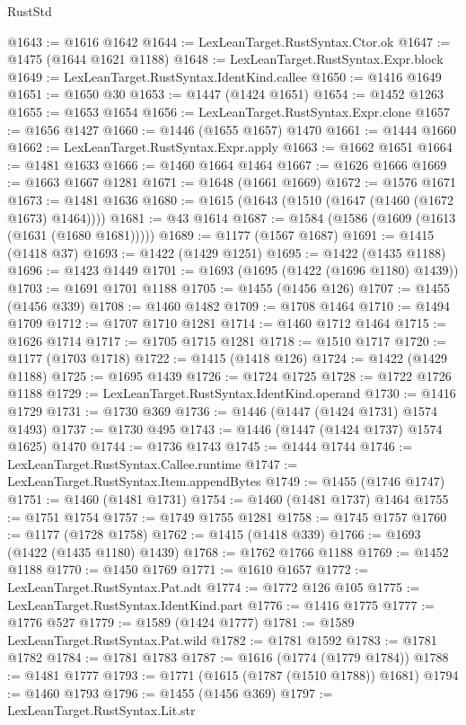 \begin{lexlean}{RustStd}
\begin{coremodule}
@1643 := @1616 @1642
@1644 := LexLeanTarget.RustSyntax.Ctor.ok
@1647 := @1475 (@1644 @1621 @1188)
@1648 := LexLeanTarget.RustSyntax.Expr.block
@1649 := LexLeanTarget.RustSyntax.IdentKind.callee
@1650 := @1416 @1649
@1651 := @1650 @30
@1653 := @1447 (@1424 @1651)
@1654 := @1452 @1263
@1655 := @1653 @1654
@1656 := LexLeanTarget.RustSyntax.Expr.clone
@1657 := @1656 @1427
@1660 := @1446 (@1655 @1657) @1470
@1661 := @1444 @1660
@1662 := LexLeanTarget.RustSyntax.Expr.apply
@1663 := @1662 @1651
@1664 := @1481 @1633
@1666 := @1460 @1664 @1464
@1667 := @1626 @1666
@1669 := @1663 @1667 @1281
@1671 := @1648 (@1661 @1669)
@1672 := @1576 @1671
@1673 := @1481 @1636
@1680 := @1615 (@1643 (@1510 (@1647 (@1460 (@1672 @1673) @1464))))
@1681 := @43 @1614
@1687 := @1584 (@1586 (@1609 (@1613 (@1631 (@1680 @1681)))))
@1689 := @1177 (@1567 @1687)
@1691 := @1415 (@1418 @37)
@1693 := @1422 (@1429 @1251)
@1695 := @1422 (@1435 @1188)
@1696 := @1423 @1449
@1701 := @1693 (@1695 (@1422 (@1696 @1180) @1439))
@1703 := @1691 @1701 @1188
@1705 := @1455 (@1456 @126)
@1707 := @1455 (@1456 @339)
@1708 := @1460 @1482
@1709 := @1708 @1464
@1710 := @1494 @1709
@1712 := @1707 @1710 @1281
@1714 := @1460 @1712 @1464
@1715 := @1626 @1714
@1717 := @1705 @1715 @1281
@1718 := @1510 @1717
@1720 := @1177 (@1703 @1718)
@1722 := @1415 (@1418 @126)
@1724 := @1422 (@1429 @1188)
@1725 := @1695 @1439
@1726 := @1724 @1725
@1728 := @1722 @1726 @1188
@1729 := LexLeanTarget.RustSyntax.IdentKind.operand
@1730 := @1416 @1729
@1731 := @1730 @369
@1736 := @1446 (@1447 (@1424 @1731) @1574 @1493)
@1737 := @1730 @495
@1743 := @1446 (@1447 (@1424 @1737) @1574 @1625) @1470
@1744 := @1736 @1743
@1745 := @1444 @1744
@1746 := LexLeanTarget.RustSyntax.Callee.runtime
@1747 := LexLeanTarget.RustSyntax.Item.appendBytes
@1749 := @1455 (@1746 @1747)
@1751 := @1460 (@1481 @1731)
@1754 := @1460 (@1481 @1737) @1464
@1755 := @1751 @1754
@1757 := @1749 @1755 @1281
@1758 := @1745 @1757
@1760 := @1177 (@1728 @1758)
@1762 := @1415 (@1418 @339)
@1766 := @1693 (@1422 (@1435 @1180) @1439)
@1768 := @1762 @1766 @1188
@1769 := @1452 @1188
@1770 := @1450 @1769
@1771 := @1610 @1657
@1772 := LexLeanTarget.RustSyntax.Pat.adt
@1774 := @1772 @126 @105
@1775 := LexLeanTarget.RustSyntax.IdentKind.part
@1776 := @1416 @1775
@1777 := @1776 @527
@1779 := @1589 (@1424 @1777)
@1781 := @1589 LexLeanTarget.RustSyntax.Pat.wild
@1782 := @1781 @1592
@1783 := @1781 @1782
@1784 := @1781 @1783
@1787 := @1616 (@1774 (@1779 @1784))
@1788 := @1481 @1777
@1793 := @1771 (@1615 (@1787 (@1510 @1788)) @1681)
@1794 := @1460 @1793
@1796 := @1455 (@1456 @369)
@1797 := LexLeanTarget.RustSyntax.Lit.str

\end{coremodule}
\end{lexlean}
